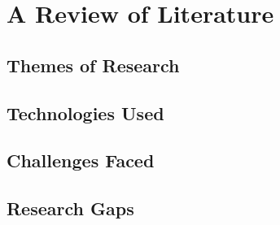 \chapter{A Review of Literature}

\section{Themes of Research}
\section{Technologies Used}
\section{Challenges Faced}
\section{Research Gaps}
